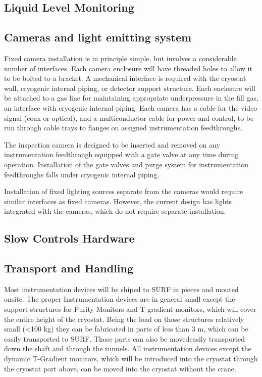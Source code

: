 \subsection{Liquid Level Monitoring}
\label{sec:fdsp-slow-cryo-install-llm}


\subsection{Cameras and light emitting system}
\label{sec:fdsp-slow-cryo-install-c}

Fixed camera installation is in principle simple, but involves a
considerable number of interfaces. Each camera enclosure will have
threaded holes to allow it to be bolted to a bracket. A mechanical
interface is required with the cryostat wall, cryogenic internal
piping, or detector support structure. Each enclosure will be attached
to a gas line for maintaining appropriate underpressure in the fill
gas, an interface with cryogenic internal piping. Each camera has a
cable for the video signal (coax or optical), and a multiconductor
cable for power and control, to be run through cable trays to flanges
on assigned instrumentation feedthroughs.

The inspection camera is designed to be inserted and removed on any
instrumentation feedthrough equipped with a gate valve at any time
during operation.  Installation of the gate valves and purge system
for instrumentation feedthroughs falls under cryogenic internal
piping.

Installation of fixed lighting sources separate from the cameras would
require similar interfaces as fixed cameras.  However, the current
design has lights integrated with the cameras, which do not require separate
installation.



\subsection{Slow Controls Hardware}
\label{sec:fdsp-slow-cryo-install-sc-hard}



\subsection{Transport and Handling}
\label{sec:fdsp-slow-cryo-install-transport}

Most instrumentation devices will be shiped to SURF in pieces and mouted onsite. The proper 
Instrumentation devices are in general small except the support structures for Purity Monitors and T-gradient monitors,
which will cover the entire height of the cryostat. Being the load on those structures relatively small (<100 kg) they can be fabricated in parts of less than 3 m,
which can be easily transported to SURF. Those parts can also be movedeasily transported down the shaft and through the tunnels.
All instrumentation devices except the dynamic T-Gradient monitors, which will be introduced into the cryostat through the cryostat port above, can be
moved into the cryostat without the crane.

